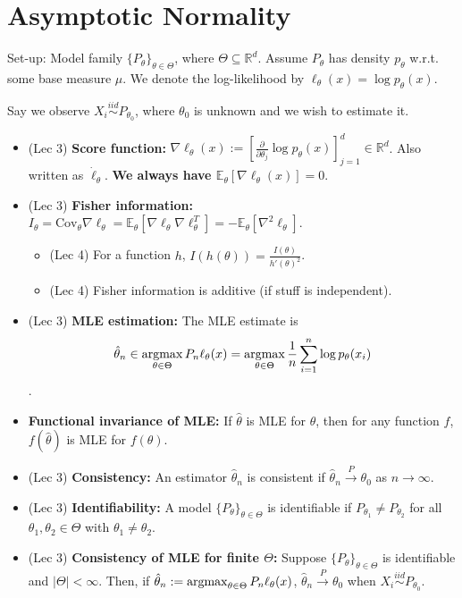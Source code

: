 \documentclass[twoside]{article}
\newcommand{\dis}{\displaystyle}
\newcommand\bbE{\mathbb{E}}
\newcommand\bbR{\mathbb{R}}
\def\t{\theta}
\newcommand\T{\Theta}
\providecommand{\argmax}{\mathop{\rm argmax}}
\newcommand\cp{\stackrel{P}{\goesto}}
\newcommand\goesto{\rightarrow}
\begin{document}
\section{Asymptotic Normality}
Set-up: Model family $\{P_\t\}_{\t \in \T}$, where $\T \subseteq \bbR^d$. Assume $P_\t$ has density $p_\t$ w.r.t. some base measure $\mu$. We denote the log-likelihood by $\ell_\t(x) = \log p_\t(x)$.

Say we observe $X_i \stackrel{iid}{\sim} P_{\t_0}$, where $\t_0$ is unknown and we wish to estimate it.

\begin{itemize}
\item (Lec 3) \textbf{Score function:} $\nabla \ell_\t(x) := \left [ \dis\frac{\partial}{\partial \t_j} \log{p_\t(x)} \right]_{j = 1}^d \in \bbR^d$. Also written as $\dot{\ell}_\t$. \textbf{We always have $\bbE_\t [\nabla \ell_\t(x)] = 0$}.

\item (Lec 3) \textbf{Fisher information:} $I_\t = \text{Cov}_\t \nabla \ell_\t = \bbE_\t \left[ \nabla \ell_\t \nabla \ell_\t^T \right] = -\bbE_\t [\nabla^2 \ell_\t]$.
\begin{itemize}
\item (Lec 4) For a function $h$, $I(h(\t)) = \dis\frac{I(\t)}{h'(\t)^2}$.

\item (Lec 4) Fisher information is additive (if stuff is independent).
\end{itemize}

\item (Lec 3) \textbf{MLE estimation:} The MLE estimate is
$$\hat{\t}_n \in \argmax_{\t \in \T} P_n \ell_\t (x) = \argmax_{\t \in \T} \dis\frac{1}{n}\sum_{i=1}^n \log p_\t(x_i)$$.

\item \textbf{Functional invariance of MLE:} If $\hat{\t}$ is MLE for $\t$, then for any function $f$, $f(\hat{\t})$ is MLE for $f(\t)$.

\item (Lec 3) \textbf{Consistency:} An estimator $\hat{\t}_n$ is consistent if $\hat{\t}_n \cp \t_0$ as $n \goesto \infty$.

\item (Lec 3) \textbf{Identifiability:} A model $\{P_\t\}_{\t \in \T}$ is identifiable if $P_{\t_1} \neq P_{\t_2}$ for all $\t_1, \t_2 \in \T$ with $\t_1 \neq \t_2$.

\item (Lec 3) \textbf{Consistency of MLE for finite $\T$:} Suppose $\{P_\theta \}_{\theta \in \Theta}$ is identifiable and $|\Theta| < \infty$. Then, if $\hat{\theta}_n := \argmax_{\theta \in \Theta} P_n \ell_\theta(x)$, $\hat{\theta}_n \cp \theta_0$ when $X_i \stackrel{iid}{\sim} P_{\theta_0}$.


\end{itemize}
\end{document}
